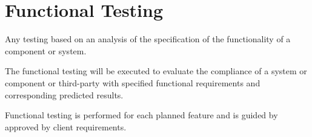 \section{Functional Testing}
\label{sec:Functional Testing}

Any testing based on an analysis of the specification of the functionality of a component or system.

The functional testing will be executed to evaluate the compliance of a system or component or third-party with specified functional requirements and corresponding predicted results.

Functional testing is performed for each planned feature and is guided by approved by client requirements.
